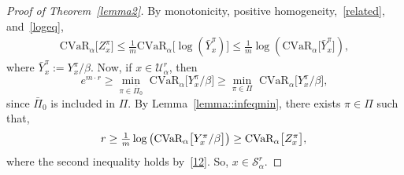 \documentclass[letterpaper, 10 pt, conference]{ieeeconf}  %
\begin{document}
\begin{proof}[Proof of Theorem~\ref{lemma2}]
By monotonicity, positive homogeneity,~\eqref{related}, and~\eqref{logeq},
%
\begin{equation}\begin{aligned}
\text{CVaR}_\alpha\big[ Z_x^\pi \big] \leq \textstyle\frac{1}{m} \text{CVaR}_\alpha\big[ \log\left( \bar{Y}_x^\pi \right) \big] 
\leq \textstyle\frac{1}{m} \log \left(\text{CVaR}_\alpha\big[ \bar{Y}_x^\pi \big] \right),
\end{aligned}\label{12}\end{equation}
%
where $\bar{Y}_x^\pi := Y_x^\pi/\beta$. Now, if $x \in \mathcal{U}_\alpha^r$, then
%
\begin{equation*}
e^{m\cdot r} \geq {\underset{\pi \in \bar{\Pi}_0}\min}\text{ CVaR}_\alpha \big[ Y_x^\pi /\beta \big] \geq {\underset{\pi \in \Pi}\min}\text{ CVaR}_\alpha \big[ Y_x^\pi /\beta \big], 
\end{equation*}
%
since $\bar{\Pi}_0$ is included in $\Pi$. By Lemma~\ref{lemma::infeqmin}, there exists $\pi \in \Pi$ such that,
\begin{equation*}
r \geq \textstyle\frac{1}{m}\log \left( \text{CVaR}_\alpha \big[  Y_x^\pi /\beta \big] \right) \geq \text{CVaR}_\alpha\big[ Z_x^\pi \big], \\
\end{equation*}
where the second inequality holds by~\eqref{12}. So, $x \in \mathcal{S}_\alpha^r$.
\end{proof}
\end{document}

